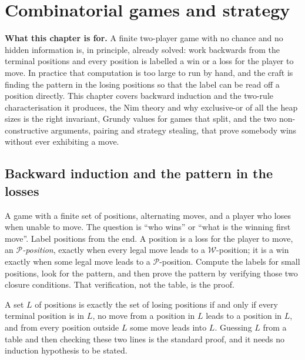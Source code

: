 \chapter{Combinatorial games and strategy}

\begin{orient}
\textbf{What this chapter is for.} A finite two-player game with no chance and no hidden information is, in principle, already solved: work backwards from the terminal positions and every position is labelled a win or a loss for the player to move. In practice that computation is too large to run by hand, and the craft is finding the pattern in the losing positions so that the label can be read off a position directly. This chapter covers backward induction and the two-rule characterisation it produces, the Nim theory and why exclusive-or of all the heap sizes is the right invariant, Grundy values for games that split, and the two non-constructive arguments, pairing and strategy stealing, that prove somebody wins without ever exhibiting a move.
\end{orient}

\section{Backward induction and the pattern in the losses}

\cue A game with a finite set of positions, alternating moves, and a player who loses when unable to move. The question is ``who wins'' or ``what is the winning first move''.
\method Label positions from the end. A position is a loss for the player to move, an \emph{$\mathcal{P}$-position}, exactly when every legal move leads to a $\mathcal{W}$-position; it is a win exactly when some legal move leads to a $\mathcal{P}$-position. Compute the labels for small positions, look for the pattern, and then prove the pattern by verifying those two closure conditions. That verification, not the table, is the proof.

\begin{keynote}
A set $L$ of positions is exactly the set of losing positions if and only if every terminal position is in $L$, no move from a position in $L$ leads to a position in $L$, and from every position outside $L$ some move leads into $L$. Guessing $L$ from a table and then checking these two lines is the standard proof, and it needs no induction hypothesis to be stated.
\end{keynote}

